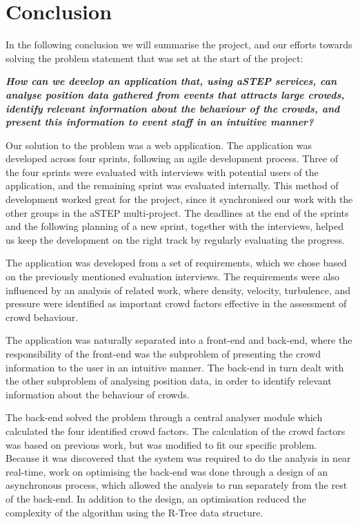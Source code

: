 \chapter{Conclusion}\label{ch:conclusion}


In the following conclusion we will summarise the project, and our efforts towards solving the problem statement that was set at the start of the project:

\begin{center}
	\textbf{\textit{How can we develop an application that, using aSTEP services, can analyse position data gathered from events that attracts large crowds, identify relevant information about the behaviour of the crowds, and present this information to event staff in an intuitive manner?}}
\end{center}

Our solution to the problem was a web application. The application was developed across four sprints, following an agile development process. Three of the four sprints were evaluated with interviews with potential users of the application, and the remaining sprint was evaluated internally. This method of development worked great for the project, since it synchronised our work with the other groups in the aSTEP multi-project. The deadlines at the end of the sprints and the following planning of a new sprint, together with the interviews, helped us keep the development on the right track by regularly evaluating the progress.

The application was developed from a set of requirements, which we chose based on the previously mentioned evaluation interviews. The requirements were also influenced by an analysis of related work, where density, velocity, turbulence, and pressure were identified as important crowd factors effective in the assessment of crowd behaviour.

The application was naturally separated into a front-end and back-end, where the responsibility of the front-end was the subproblem of presenting the crowd information to the user in an intuitive manner. The back-end in turn dealt with the other subproblem of analysing position data, in order to identify relevant information about the behaviour of crowds.

The back-end solved the problem through a central analyser module which calculated the four identified crowd factors. The calculation of the crowd factors was based on previous work, but was modified to fit our specific problem. Because it was discovered that the system was required to do the analysis in near real-time, work on optimising the back-end was done through a design of an asynchronous process, which allowed the analysis to run separately from the rest of the back-end. In addition to the design, an optimisation reduced the complexity of the algorithm using the R-Tree data structure.

